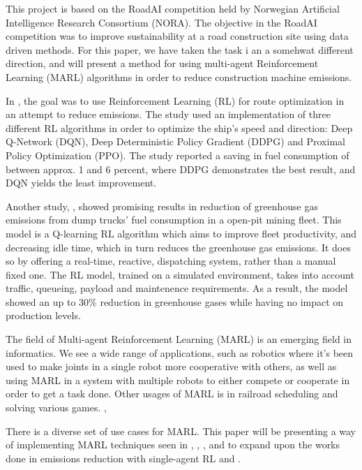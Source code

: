 \documentclass[conference]{IEEEtran}
\begin{document}
This project is based on the RoadAI competition held by Norwegian Artificial Intelligence Research
Consortium (NORA). \cite{noraRoadAIReducing} The objective in the RoadAI competition was to improve
sustainability at a road construction site using data driven methods. For this paper, we have taken the
task i an a somehwat different direction, and will present a method for using multi-agent Reinforcement
Learning (MARL) algorithms in order to reduce construction machine emissions.


In \cite{MORADI2022111882}, the goal was to use Reinforcement Learning (RL) for route optimization in
an attempt to reduce \coo{} emissions. The study used an implementation of three
different RL algorithms in order to optimize the ship's speed and direction: Deep Q-Network (DQN),
Deep Deterministic Policy Gradient (DDPG) and Proximal Policy Optimization (PPO). The study reported a
saving in fuel consumption of between approx. 1 and 6 percent, where DDPG demonstrates the best result,
and DQN yields the least improvement.

Another study, \cite{HUO2023106664}, showed promising results in reduction of greenhouse gas
emissions
from dump trucks' fuel consumption in a open-pit mining fleet. This model is a Q-learning RL algorithm
which aims to improve fleet productivity, and decreasing idle time, which in turn reduces the greenhouse
gas emissions. It does so by offering a real-time, reactive,  dispatching system, rather than a manual
fixed one. The RL model, trained on a simulated environment, takes into account traffic, queueing,
payload and maintenence requirements. As a result, the model showed an up to 30\% reduction in greenhouse
gases while having no impact on production levels.

The field of Multi-agent Reinforcement Learning (MARL) is an emerging field in informatics. We see a wide
range of applications, such as robotics where it's been used to make joints in a single robot more
cooperative with others, \cite{Perrusquia_Yu_Li_2020} as well as using MARL in a system with multiple robots
to either compete or cooperate in order to get a task done. \cite{Wang2022}
Other usages of MARL is in railroad scheduling \cite{laurent2021flatland} and solving various games.
\cite{ellis2022smacv2}, \cite{yu2022surprising}

There is a diverse set of use cases for MARL. This paper will be presenting a way of implementing
MARL techniques seen in \cite{Perrusquia_Yu_Li_2020}, \cite{Wang2022}, \cite{laurent2021flatland},
\cite{ellis2022smacv2} and \cite{yu2022surprising} to expand upon the works done in emissions reduction
with single-agent RL \cite{HUO2023106664} and \cite{MORADI2022111882}.
\end{document}
